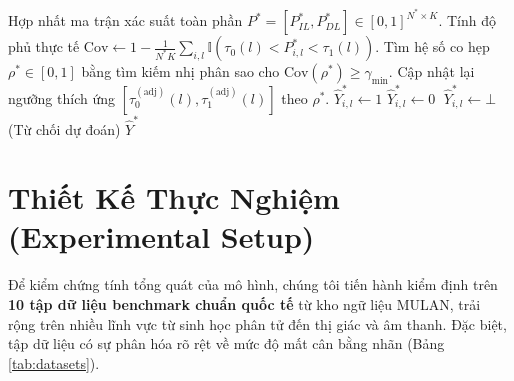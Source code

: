 \documentclass[10pt,a4paper,twoside]{article}
\begin{document}
\begin{algorithm}[H]
\begin{algorithmic}[1]
\State Hợp nhất ma trận xác suất toàn phần $P^* = [P^*_{IL}, P^*_{DL}] \in [0, 1]^{N^* \times K}$.
\State Tính độ phủ thực tế $\text{Cov} \gets 1 - \frac{1}{N^* K} \sum_{i, l} \mathbb{I}(\tau_0(l) < P^*_{i, l} < \tau_1(l))$.
    \State Tìm hệ số co hẹp $\rho^* \in [0, 1]$ bằng tìm kiếm nhị phân sao cho $\text{Cov}(\rho^*) \ge \gamma_{\min}$.
    \State Cập nhật lại ngưỡng thích ứng $[\tau_0^{(\text{adj})}(l), \tau_1^{(\text{adj})}(l)]$ theo $\rho^*$.
\EndIf
{}
     $\hat{Y}^*_{i, l} \gets 1$
     $\hat{Y}^*_{i, l} \gets 0$
    \Else $\; \hat{Y}^*_{i, l} \gets \bot$ (Từ chối dự đoán)
    \EndIf
\EndFor
\State \Return $\hat{Y}^*$
\end{algorithmic}
\end{algorithm}
\section{Thiết Kế Thực Nghiệm (Experimental Setup)}
Để kiểm chứng tính tổng quát của mô hình, chúng tôi tiến hành kiểm định trên \textbf{10 tập dữ liệu benchmark chuẩn quốc tế} từ kho ngữ liệu MULAN, trải rộng trên nhiều lĩnh vực từ sinh học phân tử đến thị giác và âm thanh. Đặc biệt, tập dữ liệu có sự phân hóa rõ rệt về mức độ mất cân bằng nhãn (Bảng \ref{tab:datasets}).
\end{document}
